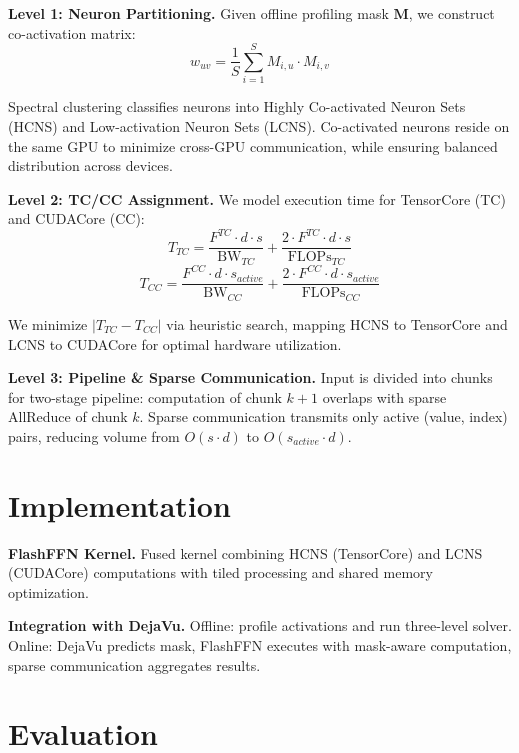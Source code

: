 \documentclass[runningheads]{llncs}
\begin{document}
\textbf{Level 1: Neuron Partitioning.} Given offline profiling mask $\mathbf{M}$, we construct co-activation matrix:
\begin{equation}
w_{uv} = \frac{1}{S}\sum_{i=1}^{S} M_{i,u} \cdot M_{i,v}
\end{equation}

Spectral clustering classifies neurons into Highly Co-activated Neuron Sets (HCNS) and Low-activation Neuron Sets (LCNS). Co-activated neurons reside on the same GPU to minimize cross-GPU communication, while ensuring balanced distribution across devices.

\textbf{Level 2: TC/CC Assignment.} We model execution time for TensorCore (TC) and CUDACore (CC):
\begin{equation}
T_{TC} = \frac{F^{TC} \cdot d \cdot s}{\text{BW}_{TC}} + \frac{2 \cdot F^{TC} \cdot d \cdot s}{\text{FLOPs}_{TC}}
\end{equation}
\begin{equation}
T_{CC} = \frac{F^{CC} \cdot d \cdot s_{active}}{\text{BW}_{CC}} + \frac{2 \cdot F^{CC} \cdot d \cdot s_{active}}{\text{FLOPs}_{CC}}
\end{equation}

We minimize $|T_{TC} - T_{CC}|$ via heuristic search, mapping HCNS to TensorCore and LCNS to CUDACore for optimal hardware utilization.

\textbf{Level 3: Pipeline \& Sparse Communication.} Input is divided into chunks for two-stage pipeline: computation of chunk $k+1$ overlaps with sparse AllReduce of chunk $k$. Sparse communication transmits only active (value, index) pairs, reducing volume from $O(s \cdot d)$ to $O(s_{active} \cdot d)$.

\section{Implementation}

\textbf{FlashFFN Kernel.} Fused kernel combining HCNS (TensorCore) and LCNS (CUDACore) computations with tiled processing and shared memory optimization.

\textbf{Integration with DejaVu.} Offline: profile activations and run three-level solver. Online: DejaVu predicts mask, FlashFFN executes with mask-aware computation, sparse communication aggregates results.

\section{Evaluation}
\end{document}
